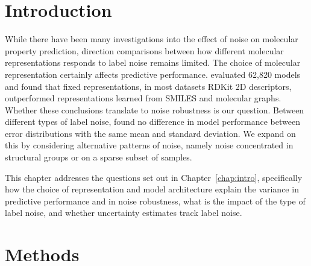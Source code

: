 
\section{Introduction}

While there have been many investigations into the effect of noise on molecular property prediction, direction comparisons between how different molecular representations responds to label noise remains limited. The choice of molecular representation certainly affects predictive performance. \citet{Deng2023} evaluated 62,820 models and found that fixed representations, in most datasets RDKit 2D descriptors, outperformed representations learned from SMILES and molecular graphs. Whether these conclusions translate to noise robustness is our question. Between different types of label noise, \citet{Heid2023} found no difference in model performance between error distributions with the same mean and standard deviation. We expand on this by considering alternative patterns of noise, namely noise concentrated in structural groups or on a sparse subset of samples.


This chapter addresses the questions set out in Chapter~\ref{chap:intro}, specifically how the choice of representation and model architecture explain the variance in predictive performance and in noise robustness, what is the impact of the type of label noise, and whether uncertainty estimates track label noise.

\section{Methods}\label{sec:robustness:methods}

